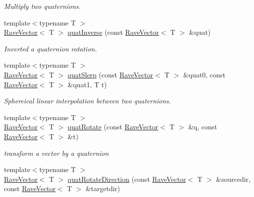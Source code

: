 \begin{DoxyCompactItemize}
\begin{DoxyCompactList}\small\item\em Multiply two quaternions. \item\end{DoxyCompactList}\item 
{\footnotesize template$<$typename T $>$ }\\\hyperlink{classOpenRAVE_1_1geometry_1_1RaveVector}{RaveVector}$<$ T $>$ \hyperlink{group__affine__math_ga7aa03948b7cc76653b754376dcd55bae}{quatInverse} (const \hyperlink{classOpenRAVE_1_1geometry_1_1RaveVector}{RaveVector}$<$ T $>$ \&quat)
\begin{DoxyCompactList}\small\item\em Inverted a quaternion rotation. \item\end{DoxyCompactList}\item 
{\footnotesize template$<$typename T $>$ }\\\hyperlink{classOpenRAVE_1_1geometry_1_1RaveVector}{RaveVector}$<$ T $>$ \hyperlink{group__affine__math_gab1abf41daa0f130493c4a0591b03b4ec}{quatSlerp} (const \hyperlink{classOpenRAVE_1_1geometry_1_1RaveVector}{RaveVector}$<$ T $>$ \&quat0, const \hyperlink{classOpenRAVE_1_1geometry_1_1RaveVector}{RaveVector}$<$ T $>$ \&quat1, T t)
\begin{DoxyCompactList}\small\item\em Sphereical linear interpolation between two quaternions. \item\end{DoxyCompactList}\item 
{\footnotesize template$<$typename T $>$ }\\\hyperlink{classOpenRAVE_1_1geometry_1_1RaveVector}{RaveVector}$<$ T $>$ \hyperlink{group__affine__math_ga53ddf2e9014f577a6915e180a3cf01e1}{quatRotate} (const \hyperlink{classOpenRAVE_1_1geometry_1_1RaveVector}{RaveVector}$<$ T $>$ \&q, const \hyperlink{classOpenRAVE_1_1geometry_1_1RaveVector}{RaveVector}$<$ T $>$ \&t)
\begin{DoxyCompactList}\small\item\em transform a vector by a quaternion \item\end{DoxyCompactList}\item 
{\footnotesize template$<$typename T $>$ }\\\hyperlink{classOpenRAVE_1_1geometry_1_1RaveVector}{RaveVector}$<$ T $>$ \hyperlink{group__affine__math_gaa6b1411c303ea16ecb279ae4a08735c0}{quatRotateDirection} (const \hyperlink{classOpenRAVE_1_1geometry_1_1RaveVector}{RaveVector}$<$ T $>$ \&sourcedir, const \hyperlink{classOpenRAVE_1_1geometry_1_1RaveVector}{RaveVector}$<$ T $>$ \&targetdir)

\end{DoxyCompactItemize}
